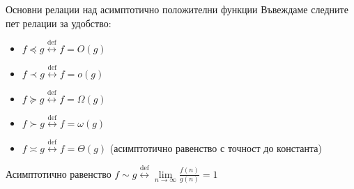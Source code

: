 \begin{boxnotation}{Основни релации над асимптотично положителни функции}{}
	Въвеждаме следните пет релации за удобство:
	\begin{itemize}
		\item $f\preccurlyeq g\overset{\text{def}}\leftrightarrow f=O(g)$
		\item $f\prec g\overset{\text{def}}\leftrightarrow f=o(g)$
		\item $f\succcurlyeq g\overset{\text{def}}\leftrightarrow f=\Omega(g)$
		\item $f\succ g\overset{\text{def}}\leftrightarrow f=\omega(g)$
		\item $f\asymp g\overset{\text{def}}\leftrightarrow f=\Theta(g)$ (асимптотично равенство с точност до константа)
	\end{itemize}
\end{boxnotation}

\begin{boxnotation}{Асимптотично равенство}{}
	$f\sim g\overset{\text{def}}\leftrightarrow\lim\limits_{n\to\infty}\frac{f(n)}{g(n)}=1$
\end{boxnotation}

